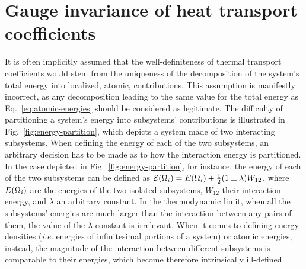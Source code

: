 \chapter{Gauge invariance of heat transport coefficients} \label{ch:gauge-invariance}

It is often implicitly assumed that the well-definiteness of thermal transport coefficients would stem from the uniqueness of the decomposition of the system's total energy into localized, atomic, contributions. This assumption is manifestly incorrect, as any decomposition leading to the same value for the total energy as Eq.~\eqref{eq:atomic-energies} should be considered as legitimate. The difficulty of partitioning a system's energy into subsystems' contributions is illustrated in Fig.~\ref{fig:energy-partition}, which depicts a system made of two interacting subsystems. When defining the energy of each of the two subsystems, an arbitrary decision has to be made as to how the interaction energy is partitioned. In the case depicted in Fig.~\ref{fig:energy-partition}, for instance, the energy of each of the two subsystems can be defined as $\mathcal{E}({\mathrm\Omega}_i) = E({\mathrm\Omega}_i) + \frac{1}{2}(1\pm\lambda)W_{12}$, where $E({\mathrm\Omega}_i)$ are the energies of the two isolated subsystems, $W_{12}$ their interaction energy, and $\lambda$ an arbitrary constant. In the thermodynamic limit, when all the subsystems' energies are much larger than the interaction between any pairs of them, the value of the $\lambda$ constant is irrelevant. When it comes to defining energy densities (\emph{i.e.} energies of infinitesimal portions of a system) or atomic energies, instead, the magnitude of the interaction between different subsystems is comparable to their energies, which become therefore intrinsically ill-defined.

